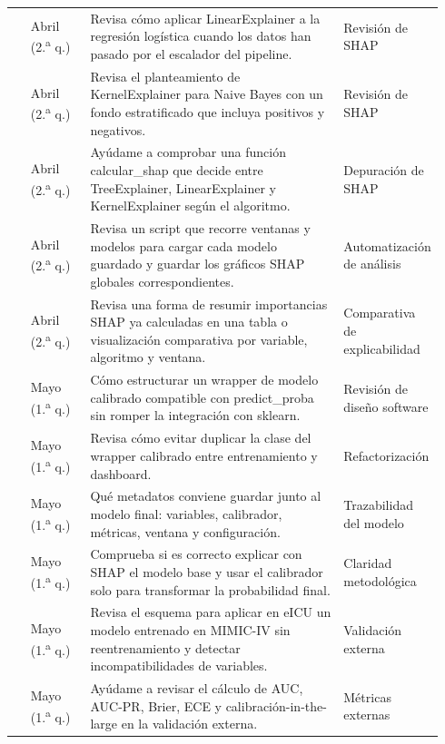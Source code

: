\documentclass[
  spanish,
  a4paper,
  12pt,
  twoside]{memoir}
\begin{document}
{\begin{longtable*}{@{} p{0.04\linewidth} p{0.14\linewidth} p{0.60\linewidth} p{0.16\linewidth} @{}}
 & Abril (2.\textsuperscript{a} q.) & Revisa cómo aplicar LinearExplainer a la regresión logística cuando los datos han pasado por el escalador del pipeline. & Revisión de SHAP \\
 & Abril (2.\textsuperscript{a} q.) & Revisa el planteamiento de KernelExplainer para Naive Bayes con un fondo estratificado que incluya positivos y negativos. & Revisión de SHAP \\
 & Abril (2.\textsuperscript{a} q.) & Ayúdame a comprobar una función calcular\_shap que decide entre TreeExplainer, LinearExplainer y KernelExplainer según el algoritmo. & Depuración de SHAP \\
 & Abril (2.\textsuperscript{a} q.) & Revisa un script que recorre ventanas y modelos para cargar cada modelo guardado y guardar los gráficos SHAP globales correspondientes. & Automatización de análisis \\
 & Abril (2.\textsuperscript{a} q.) & Revisa una forma de resumir importancias SHAP ya calculadas en una tabla o visualización comparativa por variable, algoritmo y ventana. & Comparativa de explicabilidad \\
 & Mayo (1.\textsuperscript{a} q.) & Cómo estructurar un wrapper de modelo calibrado compatible con predict\_proba sin romper la integración con sklearn. & Revisión de diseño software \\
 & Mayo (1.\textsuperscript{a} q.) & Revisa cómo evitar duplicar la clase del wrapper calibrado entre entrenamiento y dashboard. & Refactorización \\
 & Mayo (1.\textsuperscript{a} q.) & Qué metadatos conviene guardar junto al modelo final: variables, calibrador, métricas, ventana y configuración. & Trazabilidad del modelo \\
 & Mayo (1.\textsuperscript{a} q.) & Comprueba si es correcto explicar con SHAP el modelo base y usar el calibrador solo para transformar la probabilidad final. & Claridad metodológica \\
 & Mayo (1.\textsuperscript{a} q.) & Revisa el esquema para aplicar en eICU un modelo entrenado en MIMIC-IV sin reentrenamiento y detectar incompatibilidades de variables. & Validación externa \\
 & Mayo (1.\textsuperscript{a} q.) & Ayúdame a revisar el cálculo de AUC, AUC-PR, Brier, ECE y calibración-in-the-large en la validación externa. & Métricas externas \\

\end{longtable*}}
\end{document}
